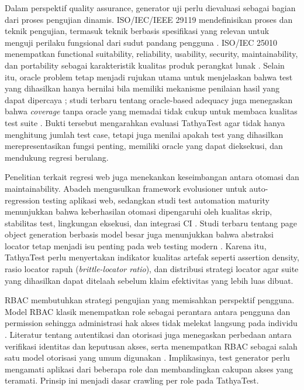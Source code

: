 \documentclass[conference]{IEEEtran}
\begin{document}
Dalam perspektif quality assurance, generator uji perlu dievaluasi sebagai bagian dari proses pengujian dinamis. ISO/IEC/IEEE 29119 mendefinisikan proses dan teknik pengujian, termasuk teknik berbasis spesifikasi yang relevan untuk menguji perilaku fungsional dari sudut pandang pengguna \cite{iso29119}. ISO/IEC 25010 menempatkan functional suitability, reliability, usability, security, maintainability, dan portability sebagai karakteristik kualitas produk perangkat lunak \cite{iso25010}. Selain itu, oracle problem tetap menjadi rujukan utama untuk menjelaskan bahwa test yang dihasilkan hanya bernilai bila memiliki mekanisme penilaian hasil yang dapat dipercaya \cite{barr2015oracle}; studi terbaru tentang oracle-based adequacy juga menegaskan bahwa \textit{coverage} tanpa oracle yang memadai tidak cukup untuk membaca kualitas test suite \cite{hossain2022oracleadequacy}. Bukti tersebut mengarahkan evaluasi TathyaTest agar tidak hanya menghitung jumlah test case, tetapi juga menilai apakah test yang dihasilkan merepresentasikan fungsi penting, memiliki oracle yang dapat dieksekusi, dan mendukung regresi berulang.

Penelitian terkait regresi web juga menekankan keseimbangan antara otomasi dan maintainability. Abadeh \cite{abadeh2021webregression} mengusulkan framework evolusioner untuk auto-regression testing aplikasi web, sedangkan studi test automation maturity menunjukkan bahwa keberhasilan otomasi dipengaruhi oleh kualitas skrip, stabilitas test, lingkungan eksekusi, dan integrasi CI \cite{wang2022maturity,wang2022quality}. Studi terbaru tentang page object generation berbasis model besar juga menunjukkan bahwa abstraksi locator tetap menjadi isu penting pada web testing modern \cite{karagoz2026pageobject}. Karena itu, TathyaTest perlu menyertakan indikator kualitas artefak seperti assertion density, rasio locator rapuh (\textit{brittle-locator ratio}), dan distribusi strategi locator agar suite yang dihasilkan dapat ditelaah sebelum klaim efektivitas yang lebih luas dibuat.

RBAC membutuhkan strategi pengujian yang memisahkan perspektif pengguna. Model RBAC klasik menempatkan role sebagai perantara antara pengguna dan permission sehingga administrasi hak akses tidak melekat langsung pada individu \cite{ferraiolo1992rbac,sandhu1996rbac}. Literatur tentang autentikasi dan otorisasi juga menegaskan perbedaan antara verifikasi identitas dan keputusan akses, serta menempatkan RBAC sebagai salah satu model otorisasi yang umum digunakan \cite{margam2026auth}. Implikasinya, test generator perlu mengamati aplikasi dari beberapa role dan membandingkan cakupan akses yang teramati. Prinsip ini menjadi dasar crawling per role pada TathyaTest.
\end{document}
